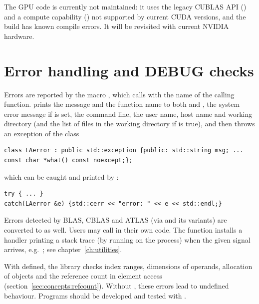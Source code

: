 The GPU code is currently not maintained: it uses the legacy CUBLAS API () and a compute capability
() not supported by current CUDA versions, and the  build has known compile errors. It will be revisited
with current NVIDIA hardware.

\section{Error handling and DEBUG checks}\label{sec:concepts:errors}


Errors are reported by the macro , which calls 
with the name of the calling function.  prints the message and the function name to both
 and , the system error message if  is set, the command line, the
user name, host name and working directory (and the list of files in the working directory if
 is true), and then throws an exception of the class
\begin{lstlisting}
class LAerror : public std::exception {public: std::string msg; ... const char *what() const noexcept;};
\end{lstlisting}
which can be caught and printed by :
\begin{lstlisting}
try { ... }
catch(LAerror &e) {std::cerr << "error: " << e << std::endl;}
\end{lstlisting}
Errors detected by BLAS, CBLAS and ATLAS (via  and its variants) are converted to 
as well. Users may call  in their own code. The function 
installs a handler printing a stack trace (by running  on the process) when the given signal arrives,
e.g.\ ; see chapter~\ref{ch:utilities}.

With  defined, the library checks index ranges, dimensions of operands, allocation of objects
and the reference count in element access (section~\ref{sec:concepts:refcount}). Without , these
errors lead to undefined behaviour. Programs should be developed and tested with .

